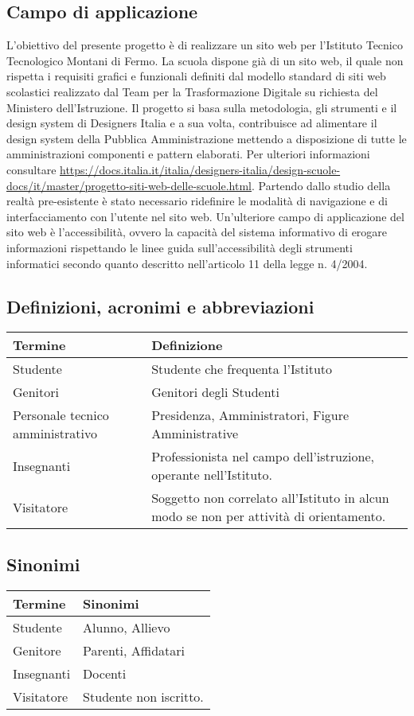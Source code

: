 \documentclass{article}
\begin{document}
	\subsection{\textbf{Campo di applicazione}}
	L'obiettivo del presente progetto è di realizzare un sito web per l'Istituto Tecnico Tecnologico Montani di Fermo. La scuola dispone già di un sito web, il quale non rispetta i requisiti grafici e funzionali definiti dal modello standard di siti web scolastici realizzato dal Team per la Trasformazione Digitale su richiesta del Ministero dell'Istruzione. Il progetto si basa sulla metodologia, gli strumenti e il design system di Designers Italia e a sua volta, contribuisce ad alimentare il design system della Pubblica Amministrazione mettendo a disposizione di tutte le amministrazioni componenti e pattern elaborati. Per ulteriori informazioni consultare \url{https://docs.italia.it/italia/designers-italia/design-scuole-docs/it/master/progetto-siti-web-delle-scuole.html}. Partendo dallo studio della realtà pre-esistente è stato necessario ridefinire le modalità di navigazione e di interfacciamento con l'utente nel sito web. Un'ulteriore campo di applicazione del sito web è l'accessibilità, ovvero la capacità del sistema informativo di erogare informazioni rispettando le linee guida sull’accessibilità degli strumenti informatici secondo quanto descritto nell’articolo 11 della legge n. 4/2004.
	
	
	\subsection{\textbf{Definizioni, acronimi e abbreviazioni}}
	\begin{tabular}{ |p{3cm}|p{8cm}|  }
	\hline
	\textbf{Termine}& \textbf{Definizione}\\
	\hline
	Studente   & Studente che frequenta l'Istituto  \\
	\hline
	Genitori & Genitori degli Studenti \\
	\hline
	Personale tecnico amministrativo & Presidenza, Amministratori, Figure Amministrative \\
	\hline
	Insegnanti   &  Professionista nel campo dell'istruzione, operante nell'Istituto.  \\
	\hline
	Visitatore  & Soggetto non correlato all'Istituto in alcun modo se non per attività di orientamento. \\	
	\hline
\end{tabular}
	
	\subsection{\textbf{Sinonimi}}
\begin{tabular}{ |p{3cm}|p{8cm}|  }
	\hline
	\textbf{Termine}& \textbf{Sinonimi}\\
	\hline
	Studente   & Alunno, Allievo  \\
	\hline
	Genitore   &  Parenti, Affidatari \\
	\hline
	Insegnanti  & Docenti\\	
	\hline
	Visitatore   & Studente non iscritto.  \\
	\hline
\end{tabular}
	
\end{document}

